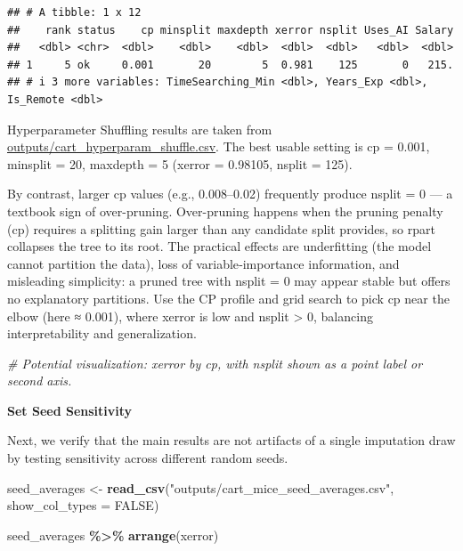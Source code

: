 \documentclass[
]{article}
\newenvironment{Shaded}{\begin{snugshade}}{\end{snugshade}}
\newcommand{\AttributeTok}[1]{\textcolor[rgb]{0.13,0.29,0.53}{#1}}
\newcommand{\CommentTok}[1]{\textcolor[rgb]{0.56,0.35,0.01}{\textit{#1}}}
\newcommand{\ConstantTok}[1]{\textcolor[rgb]{0.56,0.35,0.01}{#1}}
\newcommand{\FunctionTok}[1]{\textcolor[rgb]{0.13,0.29,0.53}{\textbf{#1}}}
\newcommand{\NormalTok}[1]{#1}
\newcommand{\OtherTok}[1]{\textcolor[rgb]{0.56,0.35,0.01}{#1}}
\newcommand{\SpecialCharTok}[1]{\textcolor[rgb]{0.81,0.36,0.00}{\textbf{#1}}}
\newcommand{\StringTok}[1]{\textcolor[rgb]{0.31,0.60,0.02}{#1}}
\begin{document}
\begin{verbatim}
## # A tibble: 1 x 12
##    rank status    cp minsplit maxdepth xerror nsplit Uses_AI Salary
##   <dbl> <chr>  <dbl>    <dbl>    <dbl>  <dbl>  <dbl>   <dbl>  <dbl>
## 1     5 ok     0.001       20        5  0.981    125       0   215.
## # i 3 more variables: TimeSearching_Min <dbl>, Years_Exp <dbl>, Is_Remote <dbl>
\end{verbatim}

Hyperparameter Shuffling results are taken from
\url{outputs/cart_hyperparam_shuffle.csv}. The best usable setting is cp
= 0.001, minsplit = 20, maxdepth = 5 (xerror = 0.98105, nsplit = 125).

By contrast, larger cp values (e.g., 0.008--0.02) frequently produce
nsplit = 0 --- a textbook sign of over-pruning. Over-pruning happens
when the pruning penalty (cp) requires a splitting gain larger than any
candidate split provides, so rpart collapses the tree to its root. The
practical effects are underfitting (the model cannot partition the
data), loss of variable‑importance information, and misleading
simplicity: a pruned tree with nsplit = 0 may appear stable but offers
no explanatory partitions. Use the CP profile and grid search to pick cp
near the elbow (here ≈ 0.001), where xerror is low and nsplit
\textgreater{} 0, balancing interpretability and generalization.

\begin{Shaded}
\begin{Highlighting}[]
\CommentTok{\# Potential visualization: xerror by cp, with nsplit shown as a point label or second axis.}
\end{Highlighting}
\end{Shaded}

\textbf{Set Seed Sensitivity}

Next, we verify that the main results are not artifacts of a single
imputation draw by testing sensitivity across different random seeds.

\begin{Shaded}
\begin{Highlighting}[]
\NormalTok{seed\_averages }\OtherTok{\textless{}{-}} \FunctionTok{read\_csv}\NormalTok{(}\StringTok{"outputs/cart\_mice\_seed\_averages.csv"}\NormalTok{, }\AttributeTok{show\_col\_types =} \ConstantTok{FALSE}\NormalTok{)}

\NormalTok{seed\_averages }\SpecialCharTok{\%\textgreater{}\%} \FunctionTok{arrange}\NormalTok{(xerror)}
\end{Highlighting}
\end{Shaded}
\end{document}

